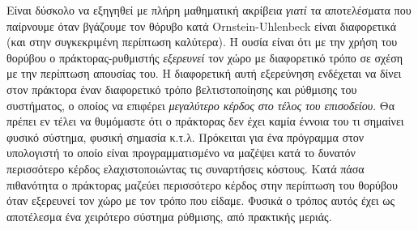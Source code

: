 \documentclass[11pt]{article} %
\numberwithin{equation}{subsection}
\begin{document}
Είναι δύσκολο να εξηγηθεί με πλήρη μαθηματική ακρίβεια \textit{γιατί} τα αποτελέσματα που παίρνουμε όταν βγάζουμε τον θόρυβο κατά Ornstein-Uhlenbeck είναι διαφορετικά (και στην συγκεκριμένη περίπτωση καλύτερα). Η ουσία είναι ότι με την χρήση του θορύβου ο πράκτορας-ρυθμιστής \textit{εξερευνεί} τον χώρο με διαφορετικό τρόπο σε σχέση με την περίπτωση απουσίας του. Η διαφορετική αυτή εξερεύνηση ενδέχεται να δίνει στον πράκτορα έναν διαφορετικό τρόπο βελτιστοποίησης και ρύθμισης του συστήματος, ο οποίος να επιφέρει \textit{μεγαλύτερο κέρδος στο τέλος του επισοδείου}. Θα πρέπει εν τέλει να θυμόμαστε ότι ο πράκτορας δεν έχει καμία έννοια του τι σημαίνει φυσικό σύστημα, φυσική σημασία κ.τ.λ. Πρόκειται για ένα πρόγραμμα στον υπολογιστή το οποίο είναι προγραμματισμένο να μαζέψει κατά το δυνατόν περισσότερο κέρδος ελαχιστοποιώντας τις συναρτήσεις κόστους. Κατά πάσα πιθανότητα ο πράκτορας μαζεύει περισσότερο κέρδος στην περίπτωση του θορύβου όταν εξερευνεί τον χώρο με τον τρόπο που είδαμε. Φυσικά ο τρόπος αυτός έχει ως αποτέλεσμα ένα χειρότερο σύστημα ρύθμισης, από πρακτικής μεριάς.\\
\end{document}
